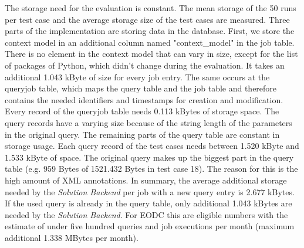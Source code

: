 \documentclass[draft,final]{vutinfth} %
\begin{document}
The storage need for the evaluation is constant. The mean storage of the 50 runs per test case and the average storage size of the test cases are measured. Three parts of the implementation are storing data in the database. First, we store the context model in an additional column named "context\_model" in the job table. There is no element in the context model that can vary in size, except for the list of packages of Python, which didn't change during the evaluation. It takes an additional 1.043 kByte of size for every job entry. The same occurs at the queryjob table, which maps the query table and the job table and therefore contains the needed identifiers and timestamps for creation and modification. Every record of the queryjob table needs 0.113 kBytes of storage space.
The query records have a varying size because of the string length of the parameters in the original query. The remaining parts of the query table are constant in storage usage. Each query record of the test cases needs between 1.520 kByte and 1.533 kByte of space. The original query makes up the biggest part in the query table (e.g. 959 Bytes of 1521.432 Bytes in test case 18). The reason for this is the high amount of XML annotations. In summary, the average additional storage needed by the \textit{Solution Backend} per job with a new query entry is 2.677 kBytes. If the used query is already in the query table, only additional 1.043 kBytes are needed by the \textit{Solution Backend}. {For EODC this are eligible numbers with the estimate of under five hundred queries and job executions per month (maximum additional 1.338 MBytes per month).}
\newpage
\end{document}
